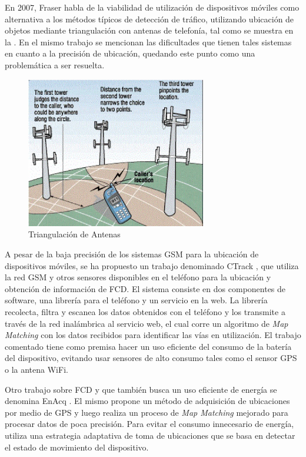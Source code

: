 En 2007, Fraser \cite{fraser2007use} habla de la viabilidad de utilización de dispositivos móviles como alternativa a los métodos típicos de detección de tráfico, utilizando ubicación de objetos mediante triangulación con antenas de telefonía, tal como se muestra en la . En el mismo trabajo se mencionan las dificultades que tienen tales sistemas en cuanto a la precisión de ubicación, quedando este punto como una problemática a ser resuelta.

\begin{figure}[h]
	\centering
	\includegraphics[width=0.7\textwidth]{capitulos/3/figuras/figura5.jpg}
	\caption{\label{fig:triangulacionAntenas} Triangulación de Antenas}	
\end{figure}

A pesar de la baja precisión de los sistemas GSM para la ubicación de dispositivos móviles, se ha propuesto un trabajo denominado CTrack \cite{thiagarajan2011accurate}, que utiliza la red GSM y otros sensores disponibles en el teléfono para la ubicación y obtención de información de FCD. El sistema consiste en dos componentes de software, una librería para el teléfono y un servicio en la web. La librería recolecta, filtra y escanea los datos obtenidos con el teléfono y los transmite a través de la red inalámbrica al servicio web, el cual corre un algoritmo de \emph{Map Matching} con los datos recibidos para identificar las vías en utilización. El trabajo comentado tiene como premisa hacer un uso eficiente del consumo de la batería del dispositivo, evitando usar sensores de alto consumo tales como el sensor GPS o la antena WiFi.

Otro trabajo sobre FCD y que también busca un uso eficiente de energía se denomina EnAcq \cite{fang2011enacq}. El mismo propone un método de adquisición de ubicaciones por medio de GPS y luego realiza un proceso de \emph{Map Matching} mejorado para procesar datos de poca precisión. Para evitar el consumo innecesario de energía, utiliza una estrategia adaptativa de toma de ubicaciones que se basa en detectar el estado de movimiento del dispositivo.

